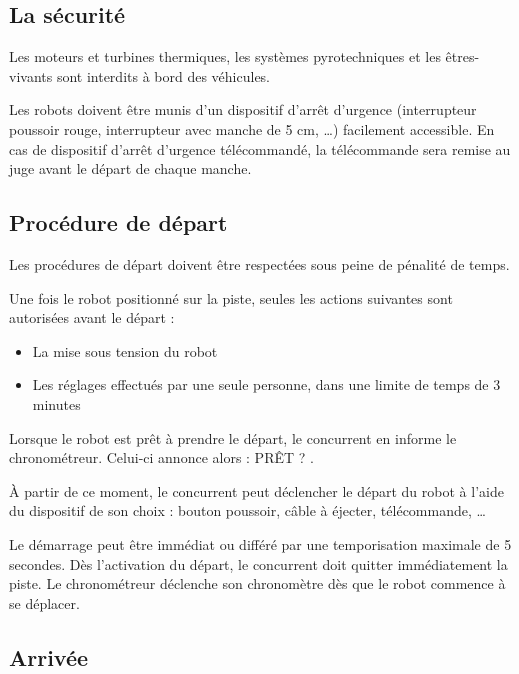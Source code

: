 \documentclass[a4paper,12pt]{book}
\begin{document}
\subsection{La sécurité}
Les moteurs et turbines thermiques, les systèmes pyrotechniques et les êtres-vivants sont interdits à bord des véhicules.
\vspace{1em}

Les robots doivent être munis d’un dispositif d’arrêt d’urgence (interrupteur poussoir rouge, interrupteur avec manche de 5 cm, …) facilement accessible. En cas de dispositif d’arrêt d’urgence télécommandé, la télécommande sera remise au juge avant le départ de chaque manche.
\vspace{1em}

\newpage
\subsection{Procédure de départ}

Les procédures de départ doivent être respectées sous peine de pénalité de temps.
\vspace{1em}

Une fois le robot positionné sur la piste, seules les actions suivantes sont autorisées avant le départ :

\begin{itemize}
    \item La mise sous tension du robot
    \item Les réglages effectués par une seule personne, dans une limite de temps de 3 minutes
\end{itemize}

Lorsque le robot est prêt à prendre le départ, le concurrent en informe le chronométreur. Celui-ci annonce alors : \og PRÊT ? \fg.

À partir de ce moment, le concurrent peut déclencher le départ du robot à l'aide du dispositif de son choix : bouton poussoir, câble à éjecter, télécommande, \dots

Le démarrage peut être immédiat ou différé par une temporisation maximale de 5 secondes. Dès l'activation du départ, le concurrent doit quitter immédiatement la piste. Le chronométreur déclenche son chronomètre dès que le robot commence à se déplacer.

\subsection{Arrivée}
\end{document}
